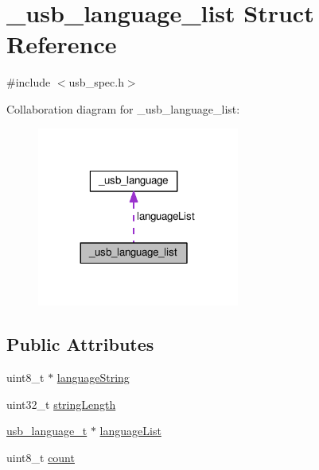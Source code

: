 \hypertarget{struct__usb__language__list}{\section{\-\_\-usb\-\_\-language\-\_\-list Struct Reference}
\label{struct__usb__language__list}
}


{\ttfamily \#include $<$usb\-\_\-spec.\-h$>$}



Collaboration diagram for \-\_\-usb\-\_\-language\-\_\-list\-:
\nopagebreak
\begin{figure}[H]
\begin{center}
\leavevmode
\includegraphics[width=188pt]{struct__usb__language__list__coll__graph}
\end{center}
\end{figure}
\subsection*{Public Attributes}
\begin{DoxyCompactItemize}
\item 
uint8\-\_\-t $\ast$ \hyperlink{struct__usb__language__list_a6748d4e8c84c9f79ae6bb19e6cba084b}{language\-String}
\item 
uint32\-\_\-t \hyperlink{struct__usb__language__list_aa8f0e2c1f75a72223ef7bf98eebbb69c}{string\-Length}
\item 
\hyperlink{usb__spec_8h_aca2ce60c60c408c537112e8ab8e31fb5}{usb\-\_\-language\-\_\-t} $\ast$ \hyperlink{struct__usb__language__list_ae5654580ba26e165fd12130418705d2d}{language\-List}
\item 
uint8\-\_\-t \hyperlink{struct__usb__language__list_a1a05af528d489960bcbe85dc956b5619}{count}
\end{DoxyCompactItemize}


